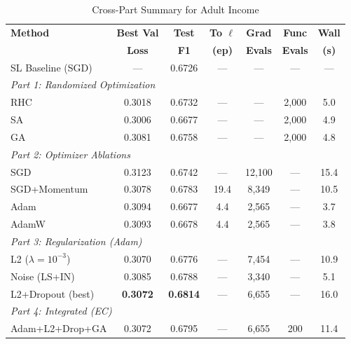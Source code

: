 \documentclass[10 pt, twocolumn]{article}
\begin{document}
\begin{table}[!htbp]
\centering
\caption{Cross-Part Summary for Adult Income}
\footnotesize
\setlength{\tabcolsep}{3pt}
\begin{tabular}{lcccccc}
\toprule
\textbf{Method} & \textbf{Best Val} & \textbf{Test} & \textbf{To $\ell$} & \textbf{Grad} & \textbf{Func} & \textbf{Wall} \\
 & \textbf{Loss} & \textbf{F1} & \textbf{(ep)} & \textbf{Evals} & \textbf{Evals} & \textbf{(s)} \\
\midrule
SL Baseline (SGD) & --- & 0.6726 & --- & --- & --- & --- \\
\midrule
\multicolumn{7}{l}{\textit{Part 1: Randomized Optimization}} \\
RHC & 0.3018 & 0.6732 & --- & --- & 2{,}000 & 5.0 \\
SA & 0.3006 & 0.6677 & --- & --- & 2{,}000 & 4.9 \\
GA & 0.3081 & 0.6758 & --- & --- & 2{,}000 & 4.8 \\
\midrule
\multicolumn{7}{l}{\textit{Part 2: Optimizer Ablations}} \\
SGD & 0.3123 & 0.6742 & --- & 12{,}100 & --- & 15.4 \\
SGD+Momentum & 0.3078 & 0.6783 & 19.4 & 8{,}349 & --- & 10.5 \\
Adam & 0.3094 & 0.6677 & 4.4 & 2{,}565 & --- & 3.7 \\
AdamW & 0.3093 & 0.6678 & 4.4 & 2{,}565 & --- & 3.8 \\
\midrule
\multicolumn{7}{l}{\textit{Part 3: Regularization (Adam)}} \\
L2 ($\lambda{=}10^{-3}$) & 0.3070 & 0.6776 & --- & 7{,}454 & --- & 10.9 \\
Noise (LS+IN) & 0.3085 & 0.6788 & --- & 3{,}340 & --- & 5.1 \\
L2+Dropout (best) & \textbf{0.3072} & \textbf{0.6814} & --- & 6{,}655 & --- & 16.0 \\
\midrule
\multicolumn{7}{l}{\textit{Part 4: Integrated (EC)}} \\
Adam+L2+Drop+GA & 0.3072 & 0.6795 & --- & 6{,}655 & 200 & 11.4 \\
\bottomrule
\end{tabular}
\end{table}
\end{document}
